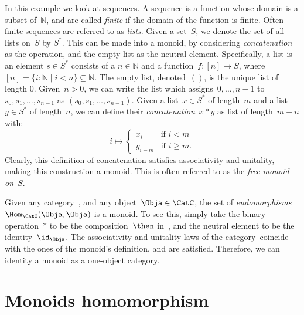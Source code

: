 \begin{example}
In this example we look at sequences. A sequence is a function whose domain is a subset of~$\mathbb{N}$, and are called \emph{finite} if the domain of the function is finite. Often finite sequences are referred to as \emph{lists}. Given a set~$S$, we denote the set of all lists on~$S$ by $S^\ast$. This can be made into a monoid, by considering \emph{concatenation} as the operation, and the empty list as the neutral element. Specifically, a list is an element $s\in S^\ast$ consists of a $n\in \mathbb{N}$ and a function~$f\colon [n]\to S$, where~$[n]=\{i\colon \mathbb{N}\mid i<n\}\subseteq \mathbb{N}$. The empty list, denoted~$()$, is the unique list of length 0. Given~$n>0$, we can write the list which assigns~$0,\ldots,n-1$ to~$s_0,s_1,\ldots,s_{n-1}$ as $(s_0,s_1,\ldots,s_{n-1})$. Given a list~$x\in S^\ast$ of length~$m$ and a list~$y\in S^\ast$ of length~$n$, we can define their \emph{concatenation}~$x*y$ as list of length~$m+n$ with:
\begin{equation*}
    i\mapsto
    \begin{cases}
    x_i&\text{if }i<m\\
    y_{i-m}&\text{if }i\geq m.
    \end{cases}
\end{equation*}
Clearly, this definition of concatenation satisfies associativity and unitality, making this construction a monoid. This is often referred to as the \emph{free monoid on~$S$}.
\end{example}

\begin{example}
Given any category~\CatC, and any object~$\Obja\in \CatC$, the set of \emph{endomorphisms}~$\Hom_{\CatC}(\Obja,\Obja)$ is a monoid. To see this, simply take the binary operation~$\ast$ to be the composition~$\then$ in~\CatC, and the neutral element to be the identity~$\id_\Obja$. The associativity and unitality laws of the category~\CatC coincide with the ones of the monoid's definition, and are satisfied. Therefore, we can identity a monoid as a one-object category.
\end{example}

\section{Monoids homomorphism}




